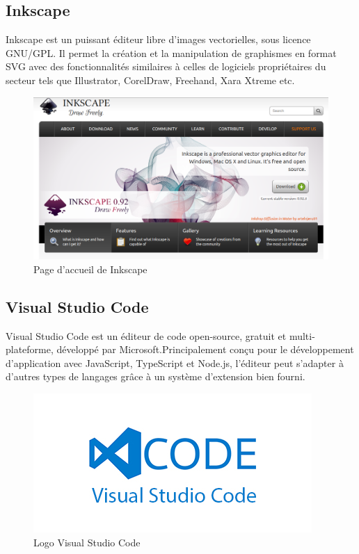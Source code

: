 \documentclass[11pt,a4paper,oneside]{book}
\begin{document}
					\subsection{Inkscape}
					Inkscape est un puissant éditeur libre d'images vectorielles, sous licence GNU/GPL. Il permet la création et la manipulation de graphismes en format SVG avec des fonctionnalités similaires à celles de logiciels propriétaires du secteur tels que Illustrator, CorelDraw, Freehand, Xara Xtreme etc.
					\begin{figure}[H]
						\centering
						\includegraphics[width=1\linewidth]{Images/ch4/inkscape}
						\caption{Page d'accueil de Inkscape}
						\label{fig:github}
					\end{figure}
					\subsection{Visual Studio Code}
					Visual Studio Code est un éditeur de code open-source, gratuit et multi-plateforme, développé par Microsoft.Principalement conçu pour le développement d'application avec JavaScript, TypeScript et Node.js, l'éditeur peut s'adapter à d'autres types de langages grâce à un système d'extension bien fourni.
					\begin{figure}[H]
						\centering
						\includegraphics[width=0.7\linewidth]{Images/ch4/vsc}
						\caption{Logo Visual Studio Code}
						\label{fig:vsc}
					\end{figure}
					
\end{document}
